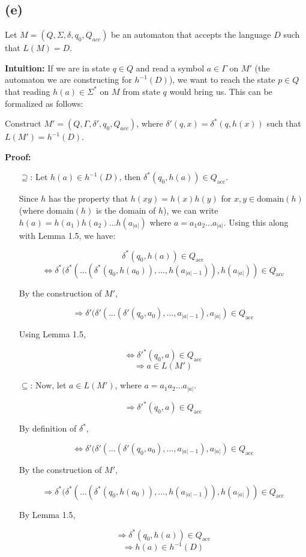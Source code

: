 \subsection{(e)}
Let \( M = (Q, \Sigma, \delta, q_0, Q_{acc}) \) be an automaton that accepts the language \( D \) such that \( L(M) = D \).

\textbf{Intuition:} If we are in state \( q \in Q \) and read a symbol \( a \in \Gamma \) on \( M' \) (the automaton we are constructing for \( h^{-1}(D) \)), we want to reach the state \( p \in Q \) that reading \( h(a) \in \Sigma^* \) on \( M \) from state \( q \) would bring us. This can be formalized as follows:

Construct \( M' = (Q, \Gamma, \delta', q_0, Q_{acc}) \), where \( \delta'(q, x) = \delta^*(q, h(x)) \) such that \( L(M') = h^{-1}(D) \).

\textbf{Proof:}
\begin{itemize}
    \item[$\supseteq$:] Let \( h(a) \in h^{-1}(D) \), then \( \delta^*(q_0, h(a)) \in Q_{\text{acc}} \).
    
    Since \( h \) has the property that \( h(xy) = h(x) h(y) \) for \( x, y \in \text{domain}(h) \) (where domain\( (h) \) is the domain of \( h \)), we can write \( h(a) = h(a_1) h(a_2) \dots h(a_{|a|}) \) where \( a = a_1 a_2 \dots a_{|a|} \). Using this along with Lemma 1.5, we have:
    
    \[
    \delta^*(q_0, h(a)) \in Q_{\text{acc}}
    \]
    \[
    \Leftrightarrow \delta^*(\delta^*(\dots(\delta^*(q_0, h(a_0)), \dots, h(a_{|a|-1})), h(a_{|a|})) \in Q_{\text{acc}}
    \]
    
    By the construction of \( M' \),
    
    \[
    \Rightarrow \delta'(\delta'(\dots(\delta'(q_0, a_0), \dots, a_{|a|-1}), a_{|a|}) \in Q_{\text{acc}}
    \]
    
    Using Lemma 1.5,
    
    \[
    \Leftrightarrow \delta'^*(q_0, a) \in Q_{\text{acc}}
    \]
    \[
    \Rightarrow a \in L(M')
    \]

    \item[$\subseteq$:] Now, let \( a \in L(M') \), where \( a = a_1 a_2 \dots a_{|a|} \).
    
    \[
    \Rightarrow \delta'^*(q_0, a) \in Q_{\text{acc}}
    \]

    By definition of \( \delta^* \),

    \[
    \Leftrightarrow \delta'(\delta'(\dots(\delta'(q_0, a_0), \dots, a_{|a|-1}), a_{|a|}) \in Q_{\text{acc}}
    \]

    By the construction of \( M' \),

    \[
    \Rightarrow \delta^*(\delta^*(\dots(\delta^*(q_0, h(a_0)), \dots, h(a_{|a|-1})), h(a_{|a|})) \in Q_{\text{acc}}
    \]

    By Lemma 1.5,

    \[
    \Rightarrow \delta^*(q_0, h(a)) \in Q_{\text{acc}}
    \]
    \[
    \Rightarrow h(a) \in h^{-1}(D)
    \]

    \qedsymbol
\end{itemize}




